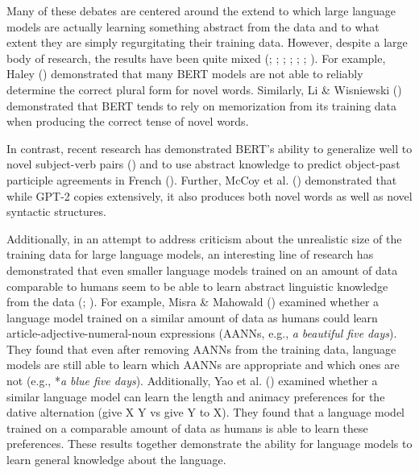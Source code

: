 \documentclass[
  12pt,
  letterpaper,
]{scrreport}
\begin{document}
Many of these debates are centered around the extend to which large
language models are actually learning something abstract from the data
and to what extent they are simply regurgitating their training data.
However, despite a large body of research, the results have been quite
mixed (;
;
;
;
;
;
). For
example, Haley () demonstrated
that many BERT models are not able to reliably determine the correct
plural form for novel words. Similarly, Li \& Wisniewski
() demonstrated that BERT
tends to rely on memorization from its training data when producing the
correct tense of novel words.

In contrast, recent research has demonstrated BERT's ability to
generalize well to novel subject-verb pairs
() and
to use abstract knowledge to predict object-past participle agreements
in French (). Further, McCoy et al.
() demonstrated that while
GPT-2 copies extensively, it also produces both novel words as well as
novel syntactic structures.

Additionally, in an attempt to address criticism about the unrealistic
size of the training data for large language models, an interesting line
of research has demonstrated that even smaller language models trained
on an amount of data comparable to humans seem to be able to learn
abstract linguistic knowledge from the data
(;
). For
example, Misra \& Mahowald
() examined whether a
language model trained on a similar amount of data as humans could learn
article-adjective-numeral-noun expressions (AANNs, e.g., \emph{a
beautiful five days}). They found that even after removing AANNs from
the training data, language models are still able to learn which AANNs
are appropriate and which ones are not (e.g., *\emph{a blue five days}).
Additionally, Yao et al.
() examined whether a
similar language model can learn the length and animacy preferences for
the dative alternation (give X Y vs give Y to X). They found that a
language model trained on a comparable amount of data as humans is able
to learn these preferences. These results together demonstrate the
ability for language models to learn general knowledge about the
language.
\end{document}

